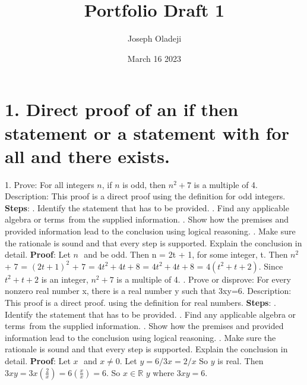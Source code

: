 \documentclass{article}
\title{Portfolio Draft 1}
\author{Joseph Oladeji}
\date{March 16 2023}
\begin{document}
\large

\maketitle

\section*{1. Direct proof of an if then statement or a statement with for all and there exists.}

1. Prove: For all integers $n$, if $n$ is odd, then \(n^2+7\) is a multiple of 4.
\newline Description: This proof is a direct proof using the definition for odd integers.
\newline \textbf{Steps}: . Identify the statement that has to be provided.
. Find any applicable algebra or terms from the supplied information.
. Show how the premises and provided information lead to the conclusion using logical reasoning.
. Make sure the rationale is sound and that every step is supported.
Explain the conclusion in detail.
\newline \textbf{Proof}: Let \(n\) \in {} \(\) and be odd.
\newline Then n = 2t + 1, for some integer, t.
\newline Then \(n^2\) + 7 = \((2t+1)^2\) + \(7\) = \(4t^2 + 4t + 8\) = \(4t^2+4t+8\) = \(4(t^2+t+2)\).
\newline Since \(t^2+t+2\) is an integer, \(n^2+7\) is a multiple of 4.
\newline
{}. Prove or disprove:  For every nonzero real number x, there is a real number y such that 3xy=6.
\newline Description: This proof is a direct proof. using the definition for real numbers.
\newline \textbf{Steps}:
. Identify the statement that has to be provided.
. Find any applicable algebra or terms from the supplied information.
. Show how the premises and provided information lead to the conclusion using logical reasoning.
. Make sure the rationale is sound and that every step is supported.
Explain the conclusion in detail.
\newline \textbf{Proof}: Let \(x\) \in {} \(\) and \(x \neq 0\).
\newline Let \(y = 6/3x = 2/x\) So \(y\) is real.
\newline Then \(3xy = 3x(\frac{2}{x}) = 6(\frac{x}{x})= 6\).
\newline So \forall \(x\in \mathbb{R}\) \exists \(y\) where \(3xy = 6\).
\end{document}
